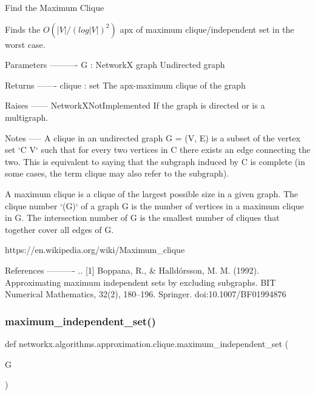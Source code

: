 \begin{DoxyVerb}Find the Maximum Clique

Finds the $O(|V|/(log|V|)^2)$ apx of maximum clique/independent set
in the worst case.

Parameters
----------
G : NetworkX graph
    Undirected graph

Returns
-------
clique : set
    The apx-maximum clique of the graph

Raises
------
NetworkXNotImplemented
    If the graph is directed or is a multigraph.

Notes
-----
A clique in an undirected graph G = (V, E) is a subset of the vertex set
`C \subseteq V` such that for every two vertices in C there exists an edge
connecting the two. This is equivalent to saying that the subgraph
induced by C is complete (in some cases, the term clique may also refer
to the subgraph).

A maximum clique is a clique of the largest possible size in a given graph.
The clique number `\omega(G)` of a graph G is the number of
vertices in a maximum clique in G. The intersection number of
G is the smallest number of cliques that together cover all edges of G.

https://en.wikipedia.org/wiki/Maximum_clique

References
----------
.. [1] Boppana, R., & Halldórsson, M. M. (1992).
    Approximating maximum independent sets by excluding subgraphs.
    BIT Numerical Mathematics, 32(2), 180–196. Springer.
    doi:10.1007/BF01994876
\end{DoxyVerb}
 \mbox{\label{namespacenetworkx_1_1algorithms_1_1approximation_1_1clique_a2cee5576172ab5ed821728432f9cb6cd}} 
\subsubsection{\texorpdfstring{maximum\+\_\+independent\+\_\+set()}{maximum\_independent\_set()}}
{\footnotesize\ttfamily def networkx.\+algorithms.\+approximation.\+clique.\+maximum\+\_\+independent\+\_\+set (\begin{DoxyParamCaption}\item[{}]{G }\end{DoxyParamCaption})}

